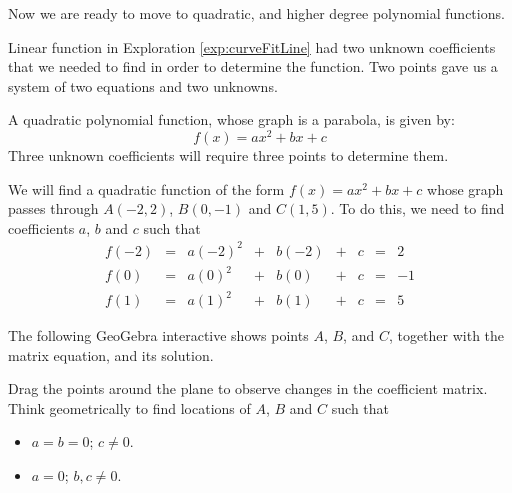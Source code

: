 \documentclass{ximera}
\begin{document}
Now we are ready to move to quadratic, and higher degree polynomial functions.

Linear function in Exploration \ref{exp:curveFitLine} had two unknown coefficients that we needed to find in order to determine the function. Two points gave us a system of two equations and two unknowns.

A quadratic polynomial function, whose graph is a parabola, is given by:
$$f(x)=ax^2+bx+c$$
Three unknown coefficients will require three points to determine them.

\begin{exploration}\label{exp:curveFitParabola}
We will find a quadratic function of the form $f(x)=ax^2+bx+c$ whose graph passes through $A(-2,2)$, $B(0, -1)$ and $C(1, 5)$.
To do this, we need to find coefficients $a$, $b$ and $c$ such that
$$\begin{matrix}f(-2)&=&a(-2)^2&+&b(-2)&+&c&=&2\\f(0)&=&a(0)^2&+&b(0)&+&c&=&-1\\f(1)&=&a(1)^2&+&b(1)&+&c&=&5\end{matrix}$$

The following GeoGebra interactive shows points $A$, $B$, and $C$, together with the matrix equation, and its solution.


\begin{onlineOnly}
\begin{center}
\end{center}
\end{onlineOnly}

Drag the points around the plane to observe changes in the coefficient matrix.  Think geometrically to find locations of $A$, $B$ and $C$ such that
\begin{itemize}
    \item $a=b=0$; $c\neq 0$.
    \item $a=0$; $b, c\neq 0$.
\end{itemize}


\end{exploration}
\end{document}
